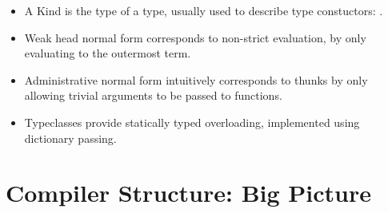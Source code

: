 \documentclass[dissertation.tex]{subfiles}
\begin{document}
{{        \begin{itemize}
        \item A Kind is the type of a type, usually used to describe type constuctors: .
        \item Weak head normal form corresponds to non-strict evaluation, by only evaluating to the outermost term.
        \item
        {
            Administrative normal form intuitively corresponds to thunks by only allowing trivial arguments to be
            passed to functions.
        }
        \item Typeclasses provide statically typed overloading, implemented using dictionary passing.
        \end{itemize}
    }
}
\section{Compiler Structure: Big Picture}\label{sec:compiler-structure}
\end{document}
